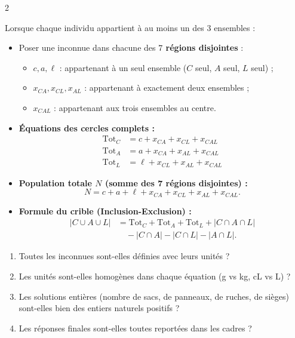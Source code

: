 {\begin{multicols}{2}
\columnbreak

Lorsque chaque individu appartient à au moins un des $3$ ensembles :
\begin{itemize}[leftmargin=1.2em, itemsep=1.5pt, topsep=2pt]
    \item Poser une inconnue dans chacune des \textbf{$7$ régions disjointes} :
    \begin{itemize}[leftmargin=1em, itemsep=1pt]
        \item $c, a, \ell$ : appartenant à un seul ensemble ($C$ seul, $A$ seul, $L$ seul) ;
        \item $x_{CA}, x_{CL}, x_{AL}$ : appartenant à exactement deux ensembles ;
        \item $x_{CAL}$ : appartenant aux trois ensembles au centre.
    \end{itemize}
    \item \textbf{Équations des cercles complets :}
    \begin{align*}
        \text{Tot}_C &= c + x_{CA} + x_{CL} + x_{CAL} \\
        \text{Tot}_A &= a + x_{CA} + x_{AL} + x_{CAL} \\
        \text{Tot}_L &= \ell + x_{CL} + x_{AL} + x_{CAL}
    \end{align*}
    \item \textbf{Population totale $N$ (somme des 7 régions disjointes) :}
    \[
        N = c + a + \ell + x_{CA} + x_{CL} + x_{AL} + x_{CAL}.
    \]
    \item \textbf{Formule du crible (Inclusion-Exclusion) :}
    \begin{align*}
        |C \cup A \cup L| &= \text{Tot}_C + \text{Tot}_A + \text{Tot}_L + |C \cap A \cap L| \\
        &\quad - |C\cap A| - |C\cap L| - |A\cap L|.
    \end{align*}
\end{itemize}

\vspace{3pt}
\begin{enumerate}[leftmargin=1.4em, itemsep=1pt, topsep=2pt]
    \item Toutes les inconnues sont-elles définies avec leurs unités ?
    \item Les unités sont-elles homogènes dans chaque équation (g vs kg, cL vs L) ?
    \item Les solutions entières (nombre de sacs, de panneaux, de ruches, de sièges) sont-elles bien des entiers naturels positifs ?
    \item Les réponses finales sont-elles toutes reportées dans les cadres ?
\end{enumerate}

\end{multicols}
}

\restoregeometry

